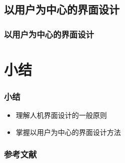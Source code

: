 \documentclass{beamer}
\begin{document}
\subsection{以用户为中心的界面设计}
\begin{frame}
	\frametitle{以用户为中心的界面设计}

\end{frame}

\section{小结}
\begin{frame}
	\frametitle{小结}
	\begin{itemize}
		\item 理解人机界面设计的一般原则
		\item 掌握以用户为中心的界面设计方法
	\end{itemize}
\end{frame}

\begin{frame}
	\frametitle{参考文献}
	
	
\end{frame}
\end{document}
